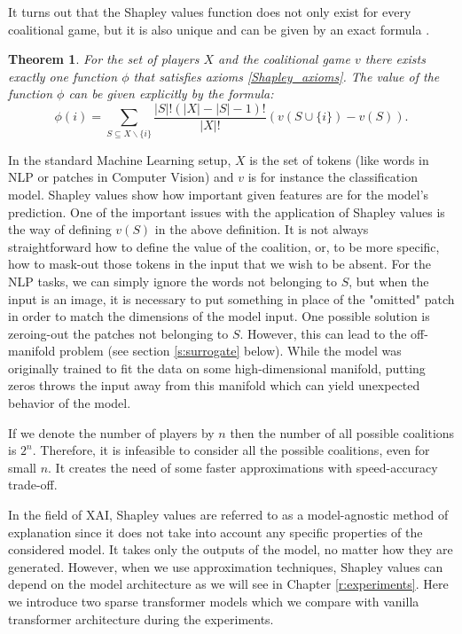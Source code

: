 \documentclass[magisterska,en]{pracamgr}
\newtheorem{thm}{Theorem}[section]
\begin{document}
It turns out that the Shapley values function does not only exist for every coalitional game, but it is also unique and can be given by an exact formula \cite{ShapleyValues}.

\begin{thm}\label{shap_def}
  For the set of players $X$ and the coalitional game $v$ there exists exactly one function $\phi$ that satisfies axioms \ref{Shapley_axioms}.
The value of the function $\phi$ can be given explicitly by the formula:
  \begin{equation*}
      \phi (i) = \sum_{S\subseteq X\backslash \{i\}} \frac{|S|!(|X|-|S|-1)!}{|X|!}\left(v(S \cup \{i\}) - v(S)\right).
  \end{equation*}
\end{thm}

In the standard Machine Learning setup, $X$ is the set of tokens (like words in NLP or patches in Computer Vision) and $v$ is for instance the classification model. Shapley values show how important given features are for the model's prediction. One of the important issues with the application of Shapley values is the way of defining $v(S)$ in the above definition. It is not always straightforward how to define the value of the coalition, or, to be more specific, how to mask-out those tokens in the input that we wish to be absent. For the NLP tasks, we can simply ignore the words not belonging to $S$, but when the input is an image, it is necessary to put something in place of the "omitted" patch in order to match the dimensions of the model input. One possible solution is zeroing-out the patches not belonging to $S$. However, this can lead to the off-manifold problem (see section \ref{s:surrogate} below). While the model was originally trained to fit the data on some high-dimensional manifold, putting zeros throws the input away from this manifold which can yield unexpected behavior of the model.



If we denote the number of players by $n$ then the number of all possible coalitions is $2^n$. Therefore, it is infeasible to consider all the possible coalitions, even for small $n$. It creates the need of some faster approximations with speed-accuracy trade-off.


In the field of XAI, Shapley values are referred to as a model-agnostic method of explanation since it does not take into account any specific properties of the considered model. It takes only the outputs of the model, no matter how they are generated. However, when we use approximation techniques, Shapley values can depend on the model architecture as we will see in Chapter \ref{r:experiments}. Here we introduce two sparse transformer models which we compare with vanilla transformer architecture during the experiments.
\end{document}
